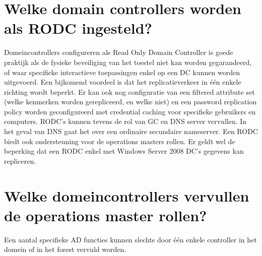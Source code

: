 \section{Welke domain controllers worden als RODC ingesteld?}

Domeincontrollers configureren als Read Only Domain Controller is goede praktijk
als de fysieke beveiliging van het toestel niet kan worden gegarandeerd, of waar
specifieke interactieve toepassingen enkel op een DC kunnen worden uitgevoerd.
Een bijkomend voordeel is dat het replicatieverkeer in één enkele richting
wordt beperkt. Er kan ook nog configuratie van een filtered attribute set (welke
kenmerken worden gerepliceerd, en welke niet) en een password replication policy
worden geconfigureerd met credential caching voor specifieke gebruikers en
computers. RODC's kunnen tevens de rol van GC en DNS server vervullen. In het
geval van DNS gaat het over een ordinaire secundaire nameserver. Een RODC biedt
ook ondersteuning voor de operations masters rollen. Er geldt wel de beperking
dat een RODC enkel met Windows Server 2008 DC's gegevens kan repliceren.

\section{Welke domeincontrollers vervullen de operations master rollen?}

Een aantal specifieke AD functies kunnen slechts door één enkele controller in
het domein of in het forest vervuld worden.

